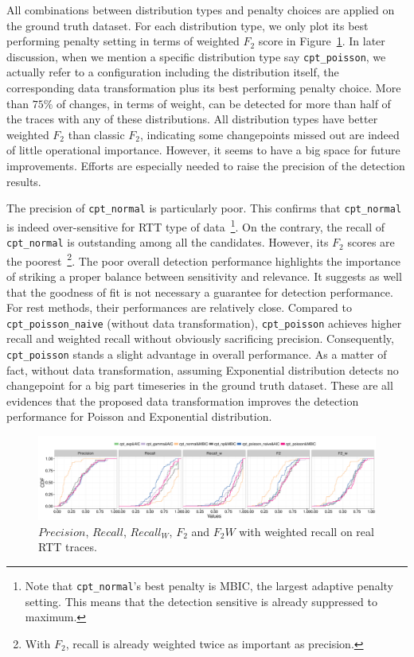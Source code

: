 All combinations between distribution types and penalty choices are applied on the ground truth dataset.
For each distribution type, we only plot its best performing penalty setting in terms of weighted $F_2$ score in Figure~\ref{fig:real_eval}.
In later discussion, when we mention a specific distribution type say \texttt{cpt\_poisson}, we actually refer to a configuration including the distribution itself, the corresponding data transformation plus its best performing penalty choice. 
More than $75\%$ of changes, in terms of weight, can be detected for more than half of the traces with any of these distributions.
All distribution types have better weighted $F_2$ than classic $F_2$, indicating some changepoints missed out are indeed of little operational importance.
However, it seems to have a big space for future improvements.
Efforts are especially needed to raise the precision of the detection results.

The precision of \texttt{cpt\_normal} is particularly poor.
This confirms that \texttt{cpt\_normal} is indeed over-sensitive for RTT type of data~\footnote{Note that \texttt{cpt\_normal}'s best penalty is MBIC, the largest adaptive penalty setting. This means that the detection sensitive is already suppressed to maximum.}.
On the contrary, the recall of \texttt{cpt\_normal} is outstanding among all the candidates.
However, its $F_2$ scores are the poorest~\footnote{With $F_2$, recall is already weighted twice as important as precision.}.
The poor overall detection performance highlights the importance of striking a proper balance between sensitivity and relevance.
It suggests as well that the goodness of fit is not necessary a guarantee for detection performance.
For rest methods, their performances are relatively close. 
Compared to \texttt{cpt\_poisson\_naive} (without data transformation), \texttt{cpt\_poisson} achieves higher recall and weighted recall without obviously sacrificing precision.
Consequently, \texttt{cpt\_poisson} stands a slight advantage in overall performance.
As a matter of fact, without data transformation, assuming Exponential distribution detects no changepoint for a big part timeseries in the ground truth dataset.
These are all evidences that the proposed data transformation improves the detection performance for Poisson and Exponential distribution.

\begin{landscape}
\begin{figure}[!ht]
\centering
\includegraphics[width=1.8\textwidth]{gfx/chap4/real_eval_bis.pdf}
\caption{$Precision$, $Recall$, $Recall_W$, $F_2$ and $F_2W$ with weighted recall on real RTT traces.}
\label{fig:real_eval}
\end{figure}
\end{landscape}

